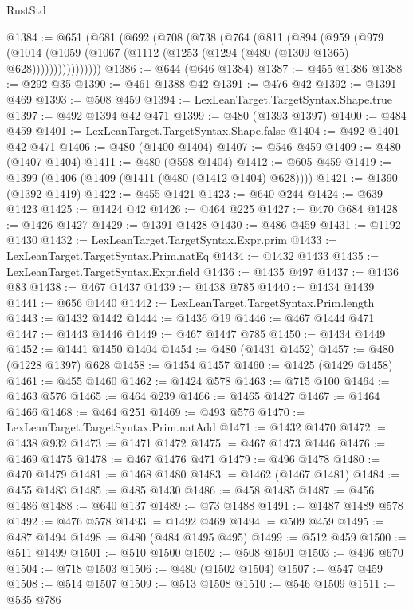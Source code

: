 \begin{lexlean}{RustStd}
\begin{coremodule}
{\begin{coremodule}
{{{{{{{{{{{{{{{{{{{{{{{{{{{{{{{{{@1384 := @651
    (@681
      (@692
        (@708
          (@738
            (@764
              (@811
                (@894
                  (@959
                    (@979
                      (@1014
                        (@1059 (@1067 (@1112 (@1253 (@1294 (@480 (@1309 @1365) @628))))))))))))))))
@1386 := @644 (@646 @1384)
@1387 := @455 @1386
@1388 := @292 @35
@1390 := @461 @1388 @42
@1391 := @476 @42
@1392 := @1391 @469
@1393 := @508 @459
@1394 := LexLeanTarget.TargetSyntax.Shape.true
@1397 := @492 @1394 @42 @471
@1399 := @480 (@1393 @1397)
@1400 := @484 @459
@1401 := LexLeanTarget.TargetSyntax.Shape.false
@1404 := @492 @1401 @42 @471
@1406 := @480 (@1400 @1404)
@1407 := @546 @459
@1409 := @480 (@1407 @1404)
@1411 := @480 (@598 @1404)
@1412 := @605 @459
@1419 := @1399 (@1406 (@1409 (@1411 (@480 (@1412 @1404) @628))))
@1421 := @1390 (@1392 @1419)
@1422 := @455 @1421
@1423 := @640 @244
@1424 := @639 @1423
@1425 := @1424 @42
@1426 := @464 @225
@1427 := @470 @684
@1428 := @1426 @1427
@1429 := @1391 @1428
@1430 := @486 @459
@1431 := @1192 @1430
@1432 := LexLeanTarget.TargetSyntax.Expr.prim
@1433 := LexLeanTarget.TargetSyntax.Prim.natEq
@1434 := @1432 @1433
@1435 := LexLeanTarget.TargetSyntax.Expr.field
@1436 := @1435 @497
@1437 := @1436 @83
@1438 := @467 @1437
@1439 := @1438 @785
@1440 := @1434 @1439
@1441 := @656 @1440
@1442 := LexLeanTarget.TargetSyntax.Prim.length
@1443 := @1432 @1442
@1444 := @1436 @19
@1446 := @467 @1444 @471
@1447 := @1443 @1446
@1449 := @467 @1447 @785
@1450 := @1434 @1449
@1452 := @1441 @1450 @1404
@1454 := @480 (@1431 @1452)
@1457 := @480 (@1228 @1397) @628
@1458 := @1454 @1457
@1460 := @1425 (@1429 @1458)
@1461 := @455 @1460
@1462 := @1424 @578
@1463 := @715 @100
@1464 := @1463 @576
@1465 := @464 @239
@1466 := @1465 @1427
@1467 := @1464 @1466
@1468 := @464 @251
@1469 := @493 @576
@1470 := LexLeanTarget.TargetSyntax.Prim.natAdd
@1471 := @1432 @1470
@1472 := @1438 @932
@1473 := @1471 @1472
@1475 := @467 @1473 @1446
@1476 := @1469 @1475
@1478 := @467 @1476 @471
@1479 := @496 @1478
@1480 := @470 @1479
@1481 := @1468 @1480
@1483 := @1462 (@1467 @1481)
@1484 := @455 @1483
@1485 := @485 @1430
@1486 := @458 @1485
@1487 := @456 @1486
@1488 := @640 @137
@1489 := @73 @1488
@1491 := @1487 @1489 @578
@1492 := @476 @578
@1493 := @1492 @469
@1494 := @509 @459
@1495 := @487 @1494
@1498 := @480 (@484 @1495 @495)
@1499 := @512 @459
@1500 := @511 @1499
@1501 := @510 @1500
@1502 := @508 @1501
@1503 := @496 @670
@1504 := @718 @1503
@1506 := @480 (@1502 @1504)
@1507 := @547 @459
@1508 := @514 @1507
@1509 := @513 @1508
@1510 := @546 @1509
@1511 := @535 @786
}}}}}}}}}}}}}}}}}}}}}}}}}}}}}}}}}
\end{coremodule}}
\end{coremodule}
\end{lexlean}
